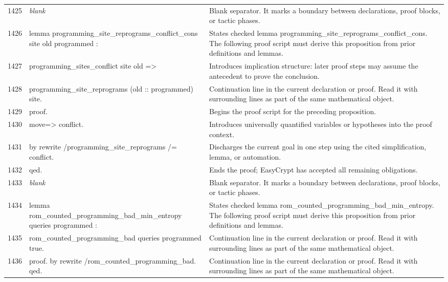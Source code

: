 \documentclass[10pt]{article}
\begin{document}
\begin{longtable}{r L{0.53\textwidth} L{0.37\textwidth}}
1425 & {\ttfamily\scriptsize \emph{blank}} & Blank separator.  It marks a boundary between declarations, proof blocks, or tactic phases. \\
1426 & {\ttfamily\scriptsize lemma programming\_site\_reprograms\_conflict\_cons site old programmed :} & States checked lemma programming\_site\_reprograms\_conflict\_cons.  The following proof script must derive this proposition from prior definitions and lemmas. \\
1427 & {\ttfamily\scriptsize   programming\_sites\_conflict site old =>} & Introduces implication structure: later proof steps may assume the antecedent to prove the conclusion. \\
1428 & {\ttfamily\scriptsize   programming\_site\_reprograms (old :: programmed) site.} & Continuation line in the current declaration or proof.  Read it with surrounding lines as part of the same mathematical object. \\
1429 & {\ttfamily\scriptsize proof.} & Begins the proof script for the preceding proposition. \\
1430 & {\ttfamily\scriptsize move=> conflict.} & Introduces universally quantified variables or hypotheses into the proof context. \\
1431 & {\ttfamily\scriptsize by rewrite /programming\_site\_reprograms /= conflict.} & Discharges the current goal in one step using the cited simplification, lemma, or automation. \\
1432 & {\ttfamily\scriptsize qed.} & Ends the proof; EasyCrypt has accepted all remaining obligations. \\
1433 & {\ttfamily\scriptsize \emph{blank}} & Blank separator.  It marks a boundary between declarations, proof blocks, or tactic phases. \\
1434 & {\ttfamily\scriptsize lemma rom\_counted\_programming\_bad\_min\_entropy queries programmed :} & States checked lemma rom\_counted\_programming\_bad\_min\_entropy.  The following proof script must derive this proposition from prior definitions and lemmas. \\
1435 & {\ttfamily\scriptsize   rom\_counted\_programming\_bad queries programmed true.} & Continuation line in the current declaration or proof.  Read it with surrounding lines as part of the same mathematical object. \\
1436 & {\ttfamily\scriptsize proof. by rewrite /rom\_counted\_programming\_bad. qed.} & Continuation line in the current declaration or proof.  Read it with surrounding lines as part of the same mathematical object. \\

\end{longtable}
\end{document}
